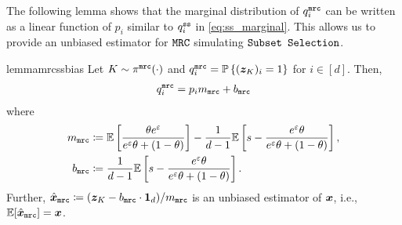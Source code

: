 The following lemma shows that the marginal distribution of $q^{\texttt{mrc}}_i$ can be written as a linear function of $p_i$ similar to $q^{\texttt{ss}}_i$ in \eqref{eq:ss_marginal}. This allows us to provide an unbiased estimator for $\texttt{MRC}$ simulating $\texttt{Subset Selection}$.
\begin{restatable}{lemma}{mrcssbias}\label{thm:mrc_ss_bias}
Let $K \sim \pi^{\texttt{mrc}}(\cdot)$ and $q^{\texttt{mrc}}_i = \mathbb{P}\left\{({\boldsymbol{z}}_K)_i = 1\right\}$ for $i \in [d]$. Then, 
\begin{align}
    q^{\texttt{mrc}}_i = p_i  m_\texttt{mrc} + b_\texttt{mrc}
\end{align}
where
\begin{align}\label{eq:q_check}
m_\texttt{mrc} & \coloneqq \mathbb{E}\left[ \frac{\theta e^\varepsilon}{e^\varepsilon \theta+(1-\theta)} \right] - \frac{1}{d-1}\mathbb{E}\left[ s-\frac{e^\varepsilon \theta}{e^\varepsilon \theta+(1-\theta)} \right], \nonumber\\
b_\texttt{mrc} & \coloneqq \frac{1}{d-1}\mathbb{E}\left[ s-\frac{e^\varepsilon \theta}{e^\varepsilon \theta + (1-\theta)} \right].
\end{align}
Further, $\hat{{\boldsymbol{x}}}_\texttt{mrc} \coloneqq ({\boldsymbol{z}}_K - b_\texttt{mrc}\cdot\mathbf{1}_d)/m_\texttt{mrc}$ is an unbiased estimator of ${\boldsymbol{x}}$, i.e., $\mathbb{E}[\hat{{\boldsymbol{x}}}_\texttt{mrc}] = {\boldsymbol{x}}$.
\end{restatable}
